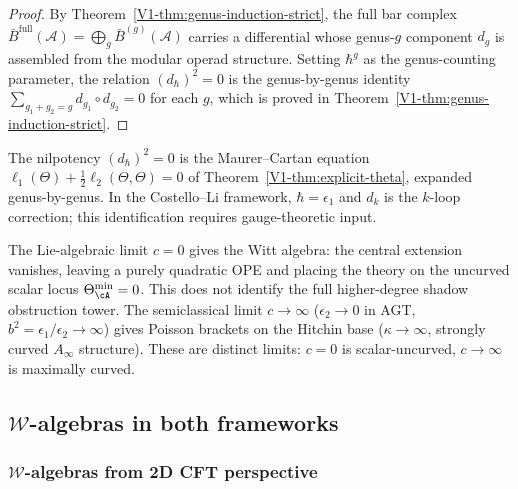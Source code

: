 \begin{proof}
By Theorem~\ref*{V1-thm:genus-induction-strict}, the full bar complex
$\bar{B}^{\mathrm{full}}(\mathcal{A}) = \bigoplus_g \bar{B}^{(g)}(\mathcal{A})$
carries a differential whose genus-$g$ component $d_g$ is assembled from
the modular operad structure. Setting $\hbar^g$ as the genus-counting
parameter, the relation $(d_\hbar)^2 = 0$ is the genus-by-genus
identity $\sum_{g_1 + g_2 = g} d_{g_1} \circ d_{g_2} = 0$
for each $g$, which is proved in Theorem~\ref*{V1-thm:genus-induction-strict}.
\end{proof}

\begin{remark}
The nilpotency $(d_\hbar)^2 = 0$ is the Maurer--Cartan equation $\ell_1(\Theta) + \tfrac{1}{2}\ell_2(\Theta, \Theta) = 0$ of Theorem~\ref*{V1-thm:explicit-theta}, expanded genus-by-genus. In the Costello--Li framework, $\hbar = \epsilon_1$ and $d_k$ is the $k$-loop correction; this identification requires gauge-theoretic input.
\end{remark}

\begin{example}
The Lie-algebraic limit $c = 0$ gives the Witt algebra: the central extension vanishes, leaving a purely quadratic OPE and placing the theory on the uncurved scalar locus $\Theta_\cA^{\min} = 0$. This does not identify the full higher-degree shadow obstruction tower. The semiclassical limit $c \to \infty$ ($\epsilon_2 \to 0$ in AGT, $b^2 = \epsilon_1/\epsilon_2 \to \infty$) gives Poisson brackets on the Hitchin base ($\kappa \to \infty$, strongly curved $A_\infty$ structure). These are distinct limits: $c = 0$ is scalar-uncurved, $c \to \infty$ is maximally curved.
\end{example}


\subsection{$\mathcal{W}$-algebras in both frameworks}
\label{sec:w-algebras-unifying}

\subsubsection{$\mathcal{W}$-algebras from 2D CFT perspective}

